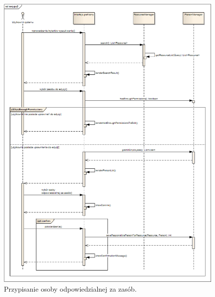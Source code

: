 \begin{figure}[h!]
	\centering
	\includegraphics[scale=0.4]{img/seq-pu-b}
	\caption{Przypisanie osoby odpowiedzialnej za zasób.\label{fig:seq-pu-b}}
\end{figure}